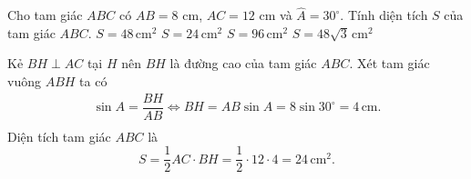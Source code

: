 \begin{bt}%
	Cho tam giác $ABC$ có $AB=8$ cm, $AC=12$ cm và $\widehat{A}=30^\circ$. Tính diện tích $S$ của tam giác $ABC$.
	\choice
	{$S = 48 \mathrm{\,cm}^2$}
	{\True $S = 24 \mathrm{\,cm}^2$}
	{$S = 96 \mathrm{\,cm}^2$}
	{$S = 48\sqrt{3} \mathrm{\,cm}^2$}
	\loigiai
	{
		\immini
		{
			Kẻ $BH\perp AC$ tại $H$ nên $BH$ là đường cao của tam giác $ABC$. Xét tam giác vuông $ABH$ ta có
			\begin{eqnarray*}
				\sin A = \dfrac{BH}{AB} \Leftrightarrow BH=AB\sin A =8\sin 30^\circ=4\mathrm{\,cm}.\\
			\end{eqnarray*}
			Diện tích tam giác $ABC$ là
			$$S=\dfrac{1}{2}AC \cdot BH = \dfrac{1}{2} \cdot 12 \cdot 4 = 24 \mathrm{\,cm}^2.$$
		}
		{
		}
	}
\end{bt}


